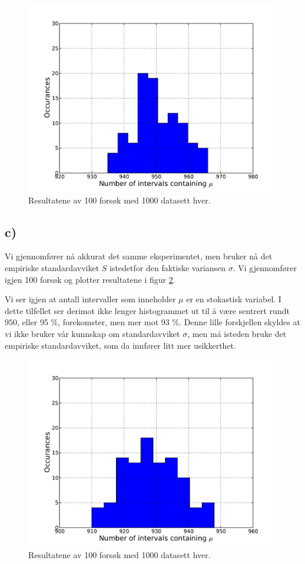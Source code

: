 \documentclass[a4paper, 11pt, titlepage, english]{article}
\begin{document}
\begin{figure}[htpb]
\centering
\includegraphics[width=\textwidth]{2b.pdf}
\caption{Resultatene av 100 forsøk med 1000 datasett hver. \label{fig:2b}}
\end{figure}

\clearpage

\subsection*{c)}
Vi gjennomfører nå akkurat det samme eksperimentet, men bruker nå det empiriske standardavviket $S$ istedetfor den faktiske variansen $\sigma$. Vi gjennomfører igjen 100 forsøk og plotter resultatene i figur \ref{fig:2c}.

Vi ser igjen at antall intervaller som inneholder $\mu$ er en stokastisk variabel. I dette tilfellet ser derimot ikke lenger histogrammet ut til å være sentrert rundt $950$, eller 95 \%, forekomster, men mer mot 93 \%. Denne lille forskjellen skyldes at vi ikke bruker vår kunnskap om standardavviket $\sigma$, men må isteden bruke det empiriske standardavviket, som da innfører litt mer usikkerthet.

\begin{figure}[htpb]
\centering
\includegraphics[width=\textwidth]{2c.pdf}
\caption{Resultatene av 100 forsøk med 1000 datasett hver. \label{fig:2c}}
\end{figure}
\end{document}
